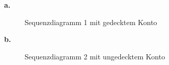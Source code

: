 \documentclass{swp1}
\begin{document}
\textbf{a.}\newline
\newline
\begin{figure}[h]
\caption{Sequenzdiagramm 1 mit gedecktem Konto}
\label{ab3}
\end{figure}
\newline

\newpage

\textbf{b.}\newline
\newline
\begin{figure}[h]
\caption{Sequenzdiagramm 2 mit ungedecktem Konto}
\end{figure}
\newline
\end{document}
